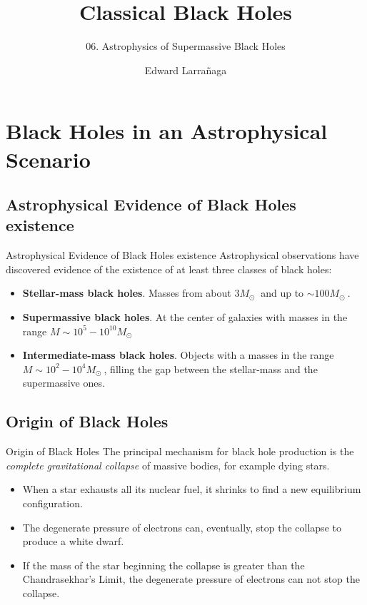 \documentclass{beamer}
\title{Classical Black Holes} %
\subtitle{06. Astrophysics of Supermassive Black Holes} %
\author{Edward Larra\~{n}aga}
\begin{document}
\frame{\maketitle}


\section{Black Holes in an Astrophysical Scenario}

\subsection{Astrophysical Evidence of Black Holes existence}
\begin{frame}{Astrophysical Evidence of Black Holes existence}
	Astrophysical observations have discovered evidence of the existence of at least three classes of black holes:
	\begin{itemize}
	\item<2-> \textbf{Stellar-mass black holes}. Masses from about $3 M_\odot\ $ and up to $\sim 100 M_\odot\ $.  
    \item<3-> \textbf{Supermassive black holes}. At the center of galaxies with  masses in the range $M \sim 10^5 - 10^{10} M_\odot\ $
    \item<4-> \textbf{Intermediate-mass black holes}. Objects with a masses in the range $M \sim 10^2 - 10^4 M_\odot\ $, filling the gap between the stellar-mass and the supermassive ones.
    \end{itemize}
\end{frame}

\subsection{Origin of Black Holes}
\begin{frame}{Origin of Black Holes}
	The principal mechanism for black hole production is the \textit{complete gravitational collapse} of massive bodies, for example dying stars.
	\begin{itemize}
    \item<2-4> When a star exhausts all its nuclear fuel, it shrinks to find a new equilibrium configuration.
    \item<3-4> The degenerate pressure of electrons can, eventually, stop the collapse to produce a white dwarf.
	\item<4-4> If the mass of the star beginning the collapse is greater than the Chandrasekhar's Limit, the degenerate pressure of electrons can not stop the collapse.
    \end{itemize}
\end{frame}
\end{document}
